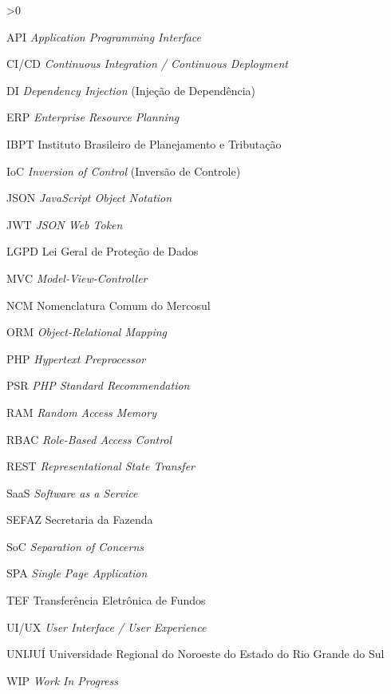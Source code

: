 \documentclass[
    12pt,               %
    oneside,            %
    a4paper,            %
    chapter=TITLE,      %
    section=TITLE,      %
    english,            %
    brazil              %
]{abntex2}
\begin{document}
\ifnum{}>0
    \listofquadros*
    \cleardoublepage
\fi
\begin{siglas}
    \item[API] \textit{Application Programming Interface}
    \item[CI/CD] \textit{Continuous Integration / Continuous Deployment}
    \item[DI] \textit{Dependency Injection} (Injeção de Dependência)
    \item[ERP] \textit{Enterprise Resource Planning}
    \item[IBPT] Instituto Brasileiro de Planejamento e Tributação
    \item[IoC] \textit{Inversion of Control} (Inversão de Controle)
    \item[JSON] \textit{JavaScript Object Notation}
    \item[JWT] \textit{JSON Web Token}
    \item[LGPD] Lei Geral de Proteção de Dados
    \item[MVC] \textit{Model-View-Controller}
    \item[NCM] Nomenclatura Comum do Mercosul
    \item[ORM] \textit{Object-Relational Mapping}
    \item[PHP] \textit{Hypertext Preprocessor}
    \item[PSR] \textit{PHP Standard Recommendation}
    \item[RAM] \textit{Random Access Memory}
    \item[RBAC] \textit{Role-Based Access Control}
    \item[REST] \textit{Representational State Transfer}
    \item[SaaS] \textit{Software as a Service}
    \item[SEFAZ] Secretaria da Fazenda
    \item[SoC] \textit{Separation of Concerns}
    \item[SPA] \textit{Single Page Application}
    \item[TEF] Transferência Eletrônica de Fundos
    \item[UI/UX] \textit{User Interface / User Experience}
    \item[UNIJUÍ] Universidade Regional do Noroeste do Estado do Rio Grande do Sul
    \item[WIP] \textit{Work In Progress}
\end{siglas}
\end{document}
